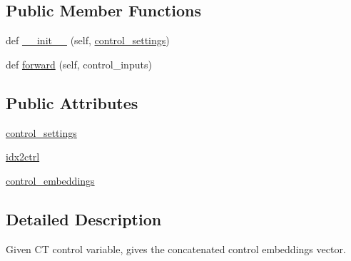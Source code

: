 \subsection*{Public Member Functions}
\begin{DoxyCompactItemize}
\item 
def \hyperlink{classprojects_1_1controllable__dialogue_1_1controllable__seq2seq_1_1modules_1_1ControlEncoder_ab8dcfaae2104f26275f8ab019492066a}{\+\_\+\+\_\+init\+\_\+\+\_\+} (self, \hyperlink{classprojects_1_1controllable__dialogue_1_1controllable__seq2seq_1_1modules_1_1ControlEncoder_adbbe77bd38eeb87b6b36c0ef388a5436}{control\+\_\+settings})
\item 
def \hyperlink{classprojects_1_1controllable__dialogue_1_1controllable__seq2seq_1_1modules_1_1ControlEncoder_ac2bef67897aca9040ff155659c786059}{forward} (self, control\+\_\+inputs)
\end{DoxyCompactItemize}
\subsection*{Public Attributes}
\begin{DoxyCompactItemize}
\item 
\hyperlink{classprojects_1_1controllable__dialogue_1_1controllable__seq2seq_1_1modules_1_1ControlEncoder_adbbe77bd38eeb87b6b36c0ef388a5436}{control\+\_\+settings}
\item 
\hyperlink{classprojects_1_1controllable__dialogue_1_1controllable__seq2seq_1_1modules_1_1ControlEncoder_af757a0435f54ad1db6f1ada3bb6f7921}{idx2ctrl}
\item 
\hyperlink{classprojects_1_1controllable__dialogue_1_1controllable__seq2seq_1_1modules_1_1ControlEncoder_a4935c48c23d2a7d4fcddbdb32d8e9ce6}{control\+\_\+embeddings}
\end{DoxyCompactItemize}


\subsection{Detailed Description}
\begin{DoxyVerb}Given CT control variable, gives the concatenated control embeddings vector.
\end{DoxyVerb}
 

